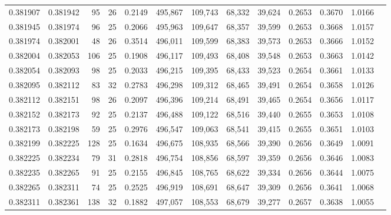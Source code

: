 \begin{tabular}{rrrrrrrrrrrrr}
0.381907 & 0.381942 &    95 &  26 &                                     0.2149 & 495,867 & 109,743 &  68,332 &  39,624 & 0.2653 & 0.3670 & 1.0166 \\
0.381945 & 0.381974 &    96 &  25 &                                     0.2066 & 495,963 & 109,647 &  68,357 &  39,599 & 0.2653 & 0.3668 & 1.0157 \\
0.381974 & 0.382001 &    48 &  26 &                                     0.3514 & 496,011 & 109,599 &  68,383 &  39,573 & 0.2653 & 0.3666 & 1.0152 \\
0.382004 & 0.382053 &   106 &  25 &                                     0.1908 & 496,117 & 109,493 &  68,408 &  39,548 & 0.2653 & 0.3663 & 1.0142 \\
0.382054 & 0.382093 &    98 &  25 &                                     0.2033 & 496,215 & 109,395 &  68,433 &  39,523 & 0.2654 & 0.3661 & 1.0133 \\
0.382095 & 0.382112 &    83 &  32 &                                     0.2783 & 496,298 & 109,312 &  68,465 &  39,491 & 0.2654 & 0.3658 & 1.0126 \\
0.382112 & 0.382151 &    98 &  26 &                                     0.2097 & 496,396 & 109,214 &  68,491 &  39,465 & 0.2654 & 0.3656 & 1.0117 \\
0.382152 & 0.382173 &    92 &  25 &                                     0.2137 & 496,488 & 109,122 &  68,516 &  39,440 & 0.2655 & 0.3653 & 1.0108 \\
0.382173 & 0.382198 &    59 &  25 &                                     0.2976 & 496,547 & 109,063 &  68,541 &  39,415 & 0.2655 & 0.3651 & 1.0103 \\
0.382199 & 0.382225 &   128 &  25 &                                     0.1634 & 496,675 & 108,935 &  68,566 &  39,390 & 0.2656 & 0.3649 & 1.0091 \\
0.382225 & 0.382234 &    79 &  31 &                                     0.2818 & 496,754 & 108,856 &  68,597 &  39,359 & 0.2656 & 0.3646 & 1.0083 \\
0.382235 & 0.382265 &    91 &  25 &                                     0.2155 & 496,845 & 108,765 &  68,622 &  39,334 & 0.2656 & 0.3644 & 1.0075 \\
0.382265 & 0.382311 &    74 &  25 &                                     0.2525 & 496,919 & 108,691 &  68,647 &  39,309 & 0.2656 & 0.3641 & 1.0068 \\
0.382311 & 0.382361 &   138 &  32 &                                     0.1882 & 497,057 & 108,553 &  68,679 &  39,277 & 0.2657 & 0.3638 & 1.0055 \\

\end{tabular}
